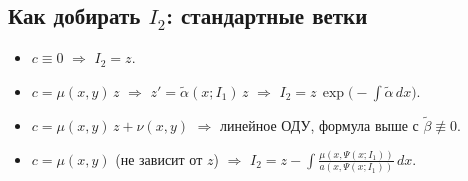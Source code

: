 \subsection{Как добирать $I_2$: стандартные ветки}\label{sec:pde-second-invariant}

\begin{itemize}
\item $c\equiv 0$ $\Rightarrow$ $I_2=z$.

\item $c=\mu(x,y)\,z$ $\Rightarrow$ $z'=\tilde{\alpha}(x;I_1)\,z$ $\Rightarrow$ $I_2=z\,\exp\!\big(-\int \tilde{\alpha}\,dx\big)$.

\item $c=\mu(x,y)\,z+\nu(x,y)$ $\Rightarrow$ линейное ОДУ, формула выше с $\tilde{\beta}\not\equiv0$.

\item $c=\mu(x,y)$ (не зависит от $z$) $\Rightarrow$ $I_2=z-\int \frac{\mu(x,\Psi(x;I_1))}{a(x,\Psi(x;I_1))}\,dx$.
\end{itemize}
